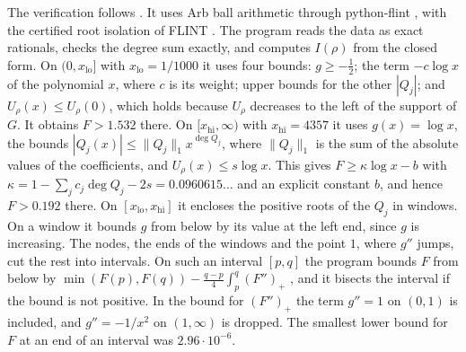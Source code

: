 \documentclass[11pt]{amsart}
\theoremstyle{remark}
\numberwithin{equation}{section}
\newcommand{\KappaLo}{0.0960615}
\newcommand{\XLO}{1/1000}
\newcommand{\XHI}{4357}
\newcommand{\LTail}{1.532}
\newcommand{\RTail}{0.192}
\newcommand{\MinEndLo}{2.96\cdot10^{-6}}
\begin{document}
The verification follows \cite[Section~3.3]{Tom26a}. It uses Arb ball arithmetic \cite{Joh17} through python-flint \cite{pyflint}, with the certified root isolation of FLINT \cite{FLINT}. The program reads the data as exact rationals, checks the degree sum exactly, and computes $I(\rho)$ from the closed form. On $(0,x_{\mathrm{lo}}]$ with $x_{\mathrm{lo}}=\XLO$ it uses four bounds: $g\ge-\frac12$; the term $-c\log x$ of the polynomial $x$, where $c$ is its weight; upper bounds for the other $|Q_j|$; and $U_\rho(x)\le U_\rho(0)$, which holds because $U_\rho$ decreases to the left of the support of $G$. It obtains $F>\LTail$ there. On $[x_{\mathrm{hi}},\infty)$ with $x_{\mathrm{hi}}=\XHI$ it uses $g(x)=\log x$, the bounds $|Q_j(x)|\le\|Q_j\|_1x^{\deg Q_j}$, where $\|Q_j\|_1$ is the sum of the absolute values of the coefficients, and $U_\rho(x)\le s\log x$. This gives $F\ge\kappa\log x-b$ with $\kappa=1-\sum_jc_j\deg Q_j-2s=\KappaLo\ldots$ and an explicit constant $b$, and hence $F>\RTail$ there. On $[x_{\mathrm{lo}},x_{\mathrm{hi}}]$ it encloses the positive roots of the $Q_j$ in windows. On a window it bounds $g$ from below by its value at the left end, since $g$ is increasing. The nodes, the ends of the windows and the point $1$, where $g''$ jumps, cut the rest into intervals. On such an interval $[p,q]$ the program bounds $F$ from below by $\min(F(p),F(q))-\frac{q-p}4\int_p^q(F'')_+$ \cite[Lemma~3.3]{Tom26a}, and it bisects the interval if the bound is not positive. In the bound for $(F'')_+$ the term $g''=1$ on $(0,1)$ is included, and $g''=-1/x^2$ on $(1,\infty)$ is dropped. The smallest lower bound for $F$ at an end of an interval was $\MinEndLo$.
\end{document}
